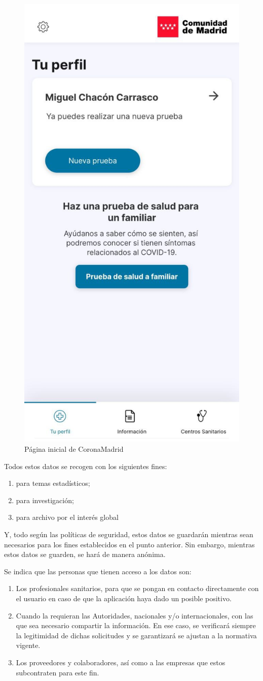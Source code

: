 \documentclass[11pt,a4paper,spanish]{article}
\begin{document}
\begin{figure}[h!]
  \centering
  \includegraphics[width=0.45\linewidth]{3.png} 
  \caption{Página inicial de CoronaMadrid}
\end{figure}

Todos estos datos se recogen con los siguientes fines:

\begin{enumerate}
\item para temas estadísticos;
\item para investigación;
\item para archivo por el interés global
\end{enumerate}

Y, todo según las políticas de seguridad, estos datos se guardarán mientras sean necesarios para los fines establecidos en el punto anterior. Sin embargo, mientras estos datos se guarden, se hará de manera anónima.

Se indica que las personas que tienen acceso a los datos son:

\begin{enumerate}
\item Los profesionales sanitarios, para que se pongan en contacto directamente con el usuario en caso de que la aplicación haya dado un posible positivo.
\item Cuando la requieran las Autoridades, nacionales y/o internacionales, con las que sea necesario compartir la información. En ese caso, se verificará siempre la legitimidad de dichas solicitudes y se garantizará se ajustan a la normativa vigente.
\item Los proveedores y colaboradores, así como a las empresas que estos subcontraten para este fin.
\end{enumerate}
\end{document}
